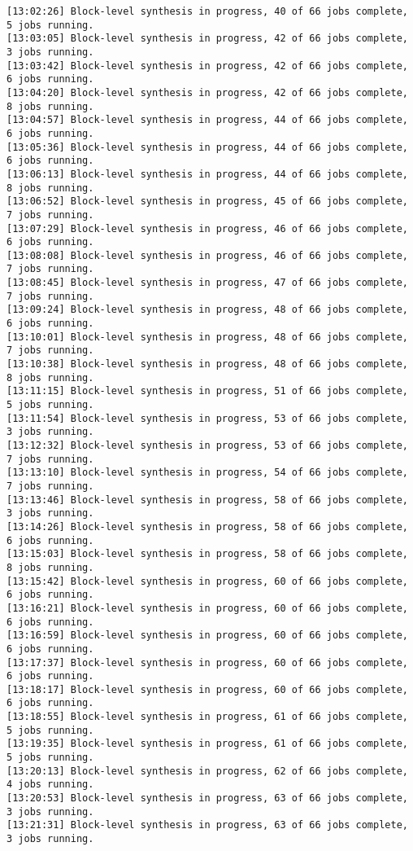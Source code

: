 \begin{lstlisting}[label=lst:lev_rec,caption=Содержимое log-файла]
[13:02:26] Block-level synthesis in progress, 40 of 66 jobs complete, 5 jobs running.
[13:03:05] Block-level synthesis in progress, 42 of 66 jobs complete, 3 jobs running.
[13:03:42] Block-level synthesis in progress, 42 of 66 jobs complete, 6 jobs running.
[13:04:20] Block-level synthesis in progress, 42 of 66 jobs complete, 8 jobs running.
[13:04:57] Block-level synthesis in progress, 44 of 66 jobs complete, 6 jobs running.
[13:05:36] Block-level synthesis in progress, 44 of 66 jobs complete, 6 jobs running.
[13:06:13] Block-level synthesis in progress, 44 of 66 jobs complete, 8 jobs running.
[13:06:52] Block-level synthesis in progress, 45 of 66 jobs complete, 7 jobs running.
[13:07:29] Block-level synthesis in progress, 46 of 66 jobs complete, 6 jobs running.
[13:08:08] Block-level synthesis in progress, 46 of 66 jobs complete, 7 jobs running.
[13:08:45] Block-level synthesis in progress, 47 of 66 jobs complete, 7 jobs running.
[13:09:24] Block-level synthesis in progress, 48 of 66 jobs complete, 6 jobs running.
[13:10:01] Block-level synthesis in progress, 48 of 66 jobs complete, 7 jobs running.
[13:10:38] Block-level synthesis in progress, 48 of 66 jobs complete, 8 jobs running.
[13:11:15] Block-level synthesis in progress, 51 of 66 jobs complete, 5 jobs running.
[13:11:54] Block-level synthesis in progress, 53 of 66 jobs complete, 3 jobs running.
[13:12:32] Block-level synthesis in progress, 53 of 66 jobs complete, 7 jobs running.
[13:13:10] Block-level synthesis in progress, 54 of 66 jobs complete, 7 jobs running.
[13:13:46] Block-level synthesis in progress, 58 of 66 jobs complete, 3 jobs running.
[13:14:26] Block-level synthesis in progress, 58 of 66 jobs complete, 6 jobs running.
[13:15:03] Block-level synthesis in progress, 58 of 66 jobs complete, 8 jobs running.
[13:15:42] Block-level synthesis in progress, 60 of 66 jobs complete, 6 jobs running.
[13:16:21] Block-level synthesis in progress, 60 of 66 jobs complete, 6 jobs running.
[13:16:59] Block-level synthesis in progress, 60 of 66 jobs complete, 6 jobs running.
[13:17:37] Block-level synthesis in progress, 60 of 66 jobs complete, 6 jobs running.
[13:18:17] Block-level synthesis in progress, 60 of 66 jobs complete, 6 jobs running.
[13:18:55] Block-level synthesis in progress, 61 of 66 jobs complete, 5 jobs running.
[13:19:35] Block-level synthesis in progress, 61 of 66 jobs complete, 5 jobs running.
[13:20:13] Block-level synthesis in progress, 62 of 66 jobs complete, 4 jobs running.
[13:20:53] Block-level synthesis in progress, 63 of 66 jobs complete, 3 jobs running.
[13:21:31] Block-level synthesis in progress, 63 of 66 jobs complete, 3 jobs running.

\end{lstlisting}
